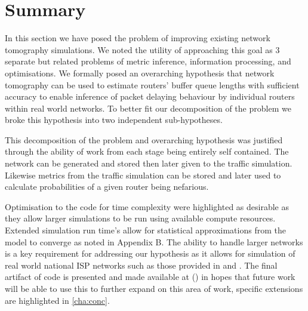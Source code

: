 \section{Summary}
\label{sec:Iintroductionsummary}

In this section we have posed the problem of improving existing network tomography simulations. We noted the utility of approaching this goal as 3 separate but related problems of metric inference, information processing, and optimisations. We formally posed an overarching hypothesis that network tomography can be used to estimate routers' buffer queue lengths with sufficient accuracy to enable inference of packet delaying behaviour by individual routers within real world networks. To better fit our decomposition of the problem we broke this hypothesis into two independent sub-hypotheses.\par
This decomposition of the problem and overarching hypothesis was justified through the ability of work from each stage being entirely self contained. The network can be generated and stored then later given to the traffic simulation. Likewise metrics from the traffic simulation can be stored and later used to calculate probabilities of a given router being nefarious.\par
Optimisation to the code for time complexity were highlighted as desirable as they allow larger simulations to be run using available compute resources. Extended simulation run time's allow for statistical approximations from the model to converge as noted in Appendix B. The ability to handle larger networks is a key requirement for addressing our hypothesis as it allows for simulation of real world national ISP networks such as those provided in \cite{knight_internet_2011} and \cite{orlowski_sndlib_2007}. The final artifact of code is presented and made available at (\cite{sylvester_millar_real_2021}) in hopes that future work will be able to use this to further expand on this area of work, specific extensions are highlighted in \cref{cha:conc}.